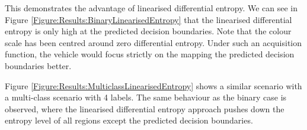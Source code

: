 			
			
			This demonstrates the advantage of linearised differential entropy. We can see in Figure \ref{Figure:Results:BinaryLinearisedEntropy} that the linearised differential entropy is only high at the predicted decision boundaries. Note that the colour scale has been centred around zero differential entropy. Under such an acquisition function, the vehicle would focus strictly on the mapping the predicted decision boundaries better.
			
			Figure \ref{Figure:Results:MulticlassLinearisedEntropy} shows a similar scenario with a multi-class scenario with 4 labels. The same behaviour as the binary case is observed, where the linearised differential entropy approach pushes down the entropy level of all regions except the predicted decision boundaries.
		
